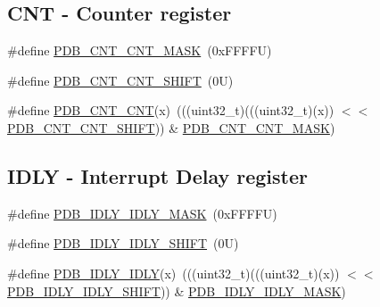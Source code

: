 \subsection*{C\+NT -\/ Counter register}
\begin{DoxyCompactItemize}
\item 
\#define \mbox{\hyperlink{group___p_d_b___register___masks_ga2c5797892b612935a1eb7ba29ea0d202}{P\+D\+B\+\_\+\+C\+N\+T\+\_\+\+C\+N\+T\+\_\+\+M\+A\+SK}}~(0x\+F\+F\+F\+F\+U)
\item 
\#define \mbox{\hyperlink{group___p_d_b___register___masks_ga684fc86038c1a05d2ba14aa872e551a6}{P\+D\+B\+\_\+\+C\+N\+T\+\_\+\+C\+N\+T\+\_\+\+S\+H\+I\+FT}}~(0\+U)
\item 
\#define \mbox{\hyperlink{group___p_d_b___register___masks_ga7450994c413fd116da0c44f36fd27f2b}{P\+D\+B\+\_\+\+C\+N\+T\+\_\+\+C\+NT}}(x)~(((uint32\+\_\+t)(((uint32\+\_\+t)(x)) $<$$<$ \mbox{\hyperlink{group___p_d_b___register___masks_ga684fc86038c1a05d2ba14aa872e551a6}{P\+D\+B\+\_\+\+C\+N\+T\+\_\+\+C\+N\+T\+\_\+\+S\+H\+I\+FT}})) \& \mbox{\hyperlink{group___p_d_b___register___masks_ga2c5797892b612935a1eb7ba29ea0d202}{P\+D\+B\+\_\+\+C\+N\+T\+\_\+\+C\+N\+T\+\_\+\+M\+A\+SK}})
\end{DoxyCompactItemize}
\subsection*{I\+D\+LY -\/ Interrupt Delay register}
\begin{DoxyCompactItemize}
\item 
\#define \mbox{\hyperlink{group___p_d_b___register___masks_gaa3a9995da0b93a73827d556de3a7f8ec}{P\+D\+B\+\_\+\+I\+D\+L\+Y\+\_\+\+I\+D\+L\+Y\+\_\+\+M\+A\+SK}}~(0x\+F\+F\+F\+F\+U)
\item 
\#define \mbox{\hyperlink{group___p_d_b___register___masks_ga7ce7e734267097f79a8fd2036dc25271}{P\+D\+B\+\_\+\+I\+D\+L\+Y\+\_\+\+I\+D\+L\+Y\+\_\+\+S\+H\+I\+FT}}~(0\+U)
\item 
\#define \mbox{\hyperlink{group___p_d_b___register___masks_ga495ff2eb5cc22dc5cc0585f77eb9c043}{P\+D\+B\+\_\+\+I\+D\+L\+Y\+\_\+\+I\+D\+LY}}(x)~(((uint32\+\_\+t)(((uint32\+\_\+t)(x)) $<$$<$ \mbox{\hyperlink{group___p_d_b___register___masks_ga7ce7e734267097f79a8fd2036dc25271}{P\+D\+B\+\_\+\+I\+D\+L\+Y\+\_\+\+I\+D\+L\+Y\+\_\+\+S\+H\+I\+FT}})) \& \mbox{\hyperlink{group___p_d_b___register___masks_gaa3a9995da0b93a73827d556de3a7f8ec}{P\+D\+B\+\_\+\+I\+D\+L\+Y\+\_\+\+I\+D\+L\+Y\+\_\+\+M\+A\+SK}})
\end{DoxyCompactItemize}
